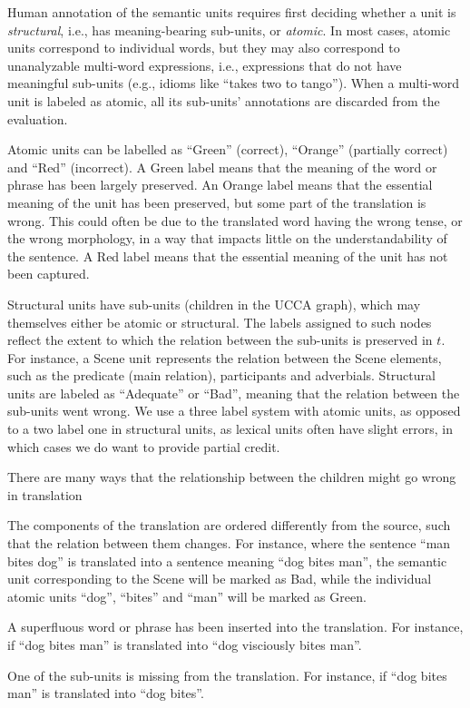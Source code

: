\documentclass[11pt]{article}
\begin{document}
Human annotation of the semantic units requires first deciding whether
a unit is {\it structural}, i.e., has meaning-bearing sub-units,
or {\it atomic}. In most cases, atomic units
correspond to individual words, but they may also correspond to unanalyzable
multi-word expressions, i.e., expressions that do not have meaningful sub-units
(e.g., idioms like ``takes two to tango'').
When a multi-word unit is labeled as atomic, all its sub-units' annotations are discarded
from the evaluation.

Atomic units can be labelled as ``Green'' (correct), ``Orange'' (partially correct)
and ``Red'' (incorrect). 
A Green label means that the meaning of the word or phrase has been largely preserved.
An Orange label means that the essential meaning of the unit has been preserved,
but some part of the translation is wrong.
This could often be due to the translated word having the wrong tense,
or the wrong morphology, in a way that impacts little on the understandability of the sentence.
A Red label means that the essential meaning of the unit has not been captured.

Structural units have sub-units (children in the UCCA graph), which may themselves
either be atomic or structural. The labels assigned to such nodes reflect the extent to which
the relation between the sub-units is preserved in $t$.
For instance, a Scene unit represents the relation between the
Scene elements, such as the predicate (main relation), participants and adverbials.
Structural units are labeled as ``Adequate'' or ``Bad'', meaning
that the relation between the sub-units went wrong.
We use a three label system with atomic units, as
opposed to a two label one in structural units,
as lexical units often have slight errors, in which cases we do want to provide partial credit.

There are many ways that the relationship between the children might go
wrong in translation

\begin{compactitem}
\item The components of the translation are ordered differently from the source,
  such that the relation between them changes. For instance, where
  the sentence ``man bites dog'' is translated into a sentence meaning ``dog bites man'',
  the semantic unit corresponding to the Scene will be marked as Bad, while
  the individual atomic units ``dog'', ``bites'' and ``man'' will be marked as Green.
\item A superfluous word or phrase has been inserted into
  the translation. For instance, if ``dog bites man'' is translated into ``dog visciously bites man''.
\item One of the sub-units is missing from the translation.
  For instance, if ``dog bites man'' is translated into ``dog bites''.
\end{compactitem}
\end{document}
